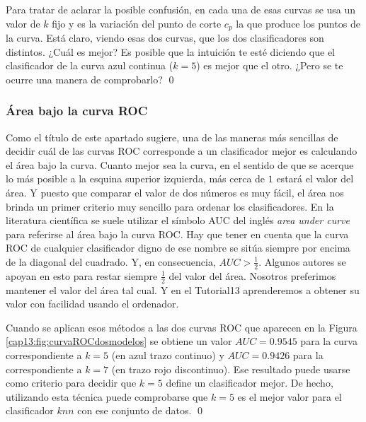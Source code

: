 \begin{ejemplo}
Para tratar de aclarar la posible confusión, en cada una de esas curvas se usa un valor de $k$ fijo y es la variación del punto de corte  $c_p$ la que produce los puntos de la curva. Está claro, viendo esas dos curvas,  que los dos clasificadores son distintos. ¿Cuál es mejor? Es posible que la intuición te esté diciendo que el clasificador de la curva azul continua ($k=5$) es mejor que el otro. ¿Pero se te ocurre una manera de comprobarlo?
\qed
\end{ejemplo}


 \subsubsection{Área bajo la curva ROC}

 Como el título de este apartado sugiere,  una de las maneras más sencillas de decidir cuál de las curvas ROC corresponde  a un clasificador mejor es calculando el área bajo la curva. Cuanto mejor sea la curva, en el sentido de que se acerque lo más posible a la esquina superior izquierda, más cerca de $1$ estará el valor del área. Y puesto que comparar el valor de dos números es muy fácil, el área nos brinda un primer criterio muy sencillo para ordenar los clasificadores.  En la literatura científica se suele utilizar el símbolo {\sf AUC} del inglés {\em area under curve} para referirse al área bajo la curva ROC. Hay que tener en cuenta que la curva ROC de cualquier clasificador digno de ese nombre se sitúa siempre por encima  de la diagonal del cuadrado. Y, en consecuencia, $AUC > \frac{1}{2}$.  Algunos autores se apoyan en esto para restar siempre $\frac{1}{2}$ del valor del área. Nosotros preferimos mantener el valor del área tal cual.  Y en el Tutorial13 aprenderemos a obtener su valor con facilidad usando el ordenador.


\begin{ejemplo}
\label{cap13:ejem:AUC}

Cuando se aplican esos métodos a las dos curvas ROC que aparecen en la Figura \ref{cap13:fig:curvaROCdosmodelos} se obtiene un valor $AUC = 0.9545$ para la curva correspondiente a  $k=5$ (en azul trazo continuo) y $AUC = 0.9426$ para la correspondiente a $k=7$ (en trazo rojo discontinuo). Ese resultado puede usarse como criterio para decidir que $k=5$ define un clasificador mejor. De hecho, utilizando esta técnica puede comprobarse que $k=5$ es el mejor valor para el clasificador $knn$ con ese conjunto de datos.
\qed
\end{ejemplo}

